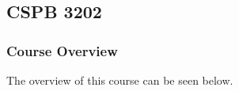 \clearpage

\renewcommand{\ChapTitle}{\CSPBAI}
\renewcommand{\SectionTitle}{CSPB 3202}

\chapter{\ChapTitle}
\section{\SectionTitle}

\subsection{Course Overview}

The overview of this course can be seen below.

